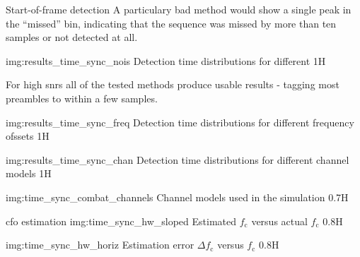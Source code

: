 \begin{subchapter}{Start-of-frame detection}
  A particulary bad method would show a single peak in the
  ``missed'' bin, indicating that the sequence was missed by
  more than ten samples or not detected at all.

               {img:results_time_sync_nois}
               {Detection time distributions for different }
               {1}{H}

  For high \glspl{snr} all of the tested methods produce
  usable results - tagging most preambles to within a few
  samples.

               {img:results_time_sync_freq}
               {Detection time distributions for different frequency ofssets}
               {1}{H}

               {img:results_time_sync_chan}
               {Detection time distributions for different channel models}
               {1}{H}

               {img:time_sync_combat_channels}
               {Channel models used in the simulation}
               {0.7}{H}

\end{subchapter}

\begin{subchapter}{\Acrlong{cfo} estimation}
                  {img:time_sync_hw_sloped}
                  {Estimated $f_\text{c}$ versus actual $f_\text{c}$}
                  {0.8}{H}

                  {img:time_sync_hw_horiz}
                  {Estimation error $\Delta f_\text{c}$ versus $f_\text{c}$}
                  {0.8}{H}
\end{subchapter}

